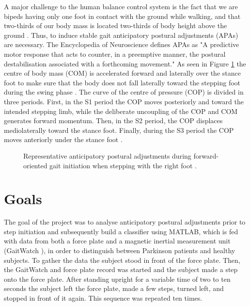 A major challenge to the human balance control system is the fact that we are bipeds having only one foot in contact with the ground while walking, and that two-thirds  of our body mass is located two-thirds of body height above the ground \cite{halliday_initiation_1998}. Thus, to induce stable gait anticipatory postural adjustments (APAs) are necessary. The Encyclopedia of Neuroscience \cite[p.133]{woollacott_anticipatory_2009} defines APAs as "A predictive motor response that acts to counter, in a preemptive manner, the postural destabilisation associated with a forthcoming movement." As seen in Figure \ref{fig:APAoverview} the centre of body mass (COM) is accelerated forward and laterally over the stance foot to make sure that the body does not fall laterally toward the stepping foot during the swing phase \cite{woollacott_anticipatory_2009}. The curve of the centre of pressure (COP) is divided in three periods. First, in the S1 period the COP moves posteriorly and toward the intended stepping limb, while the deliberate uncoupling of the COP and COM generates forward momentum. Then, in the S2 period, the COP displaces mediolaterally toward the stance foot. Finally, during the S3 period the COP moves anteriorly under the stance foot \cite{hass_gait_2005-1}.

\begin{figure}
	\centering
	\caption{Representative anticipatory postural adjustments during forward-oriented gait initiation when stepping with the right foot \cite{hass_gait_2005-1}.}
	\label{fig:APAoverview}
\end{figure}


\section{Goals}

The goal of the project was to analyse anticipatory postural adjustments prior to step initiation and subsequently build a classifier using MATLAB, which is fed with data from both a force plate and a magnetic inertial measurement unit (GaitWatch \cite{olivares_vicente_gaitwatch_2013}), in order to distinguish between Parkinson patients and healthy subjects. To gather the data the subject stood in front of the force plate. Then, the GaitWatch and force plate record was started and the subject made a step onto the force plate. After standing upright for a variable time of two to ten seconds the subject left the force plate, made a few steps, turned left, and stopped in front of it again. This sequence was repeated ten times.


